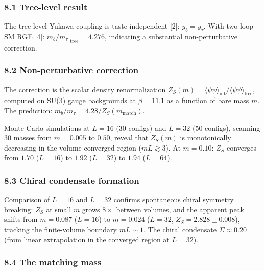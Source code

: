 \documentclass[
  11pt,
]{article}
\begin{document}
\hypertarget{tree-level-result}{%
\subsubsection{8.1 Tree-level result}\label{tree-level-result}}

The tree-level Yukawa coupling is taste-independent {[}2{]}:
\(y_b = y_\tau\). With two-loop SM RGE {[}4{]}:
\(m_b/m_\tau|_{\text{tree}} = 4.276\), indicating a substantial
non-perturbative correction.

\hypertarget{non-perturbative-correction}{%
\subsubsection{8.2 Non-perturbative
correction}\label{non-perturbative-correction}}

The correction is the scalar density renormalization
\(Z_S(m) = \langle\bar\psi\psi\rangle_{\text{int}} / \langle\bar\psi\psi\rangle_{\text{free}}\),
computed on SU(3) gauge backgrounds at \(\beta = 11.1\) as a function of
bare mass \(m\). The prediction:
\(m_b/m_\tau = 4.28/Z_S(m_{\text{match}})\).

Monte Carlo simulations at \(L = 16\) (30 configs) and \(L = 32\) (50
configs), scanning 30 masses from \(m = 0.005\) to \(0.50\), reveal that
\(Z_S(m)\) is monotonically decreasing in the volume-converged region
(\(mL \gtrsim 3\)). At \(m = 0.10\): \(Z_S\) converges from \(1.70\)
(\(L{=}16\)) to \(1.92\) (\(L{=}32\)) to \(1.94\) (\(L{=}64\)).

\hypertarget{chiral-condensate-formation}{%
\subsubsection{8.3 Chiral condensate
formation}\label{chiral-condensate-formation}}

Comparison of \(L = 16\) and \(L = 32\) confirms spontaneous chiral
symmetry breaking: \(Z_S\) at small \(m\) grows \(8\times\) between
volumes, and the apparent peak shifts from \(m = 0.087\) (\(L{=}16\)) to
\(m = 0.024\) (\(L{=}32\), \(Z_S = 2.828 \pm 0.008\)), tracking the
finite-volume boundary \(mL \sim 1\). The chiral condensate
\(\Sigma \approx 0.20\) (from linear extrapolation in the converged
region at \(L = 32\)).

\hypertarget{the-matching-mass}{%
\subsubsection{8.4 The matching mass}\label{the-matching-mass}}
\end{document}
